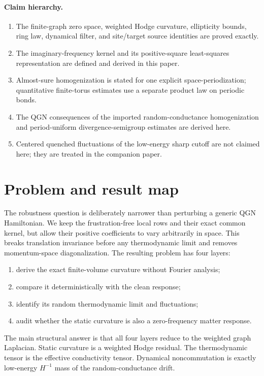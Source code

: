 \documentclass[11pt]{article}
\theoremstyle{definition}
\theoremstyle{remark}
\begin{document}
\paragraph{Claim hierarchy.}
\begin{enumerate}[leftmargin=2.2em,itemsep=0.2em]
 \item The finite-graph zero space, weighted Hodge curvature, ellipticity bounds, ring law, dynamical filter, and site/target source identities are proved exactly.
 \item The imaginary-frequency kernel and its positive-square least-squares representation are defined and derived in this paper.
 \item Almost-sure homogenization is stated for one explicit space-periodization; quantitative finite-torus estimates use a separate product law on periodic bonds.
 \item The QGN consequences of the imported random-conductance homogenization and period-uniform divergence-semigroup estimates are derived here.
 \item Centered quenched fluctuations of the low-energy sharp cutoff are not claimed here; they are treated in the companion paper.
\end{enumerate}
\section{Problem and result map}

The robustness question is deliberately narrower than perturbing a generic QGN Hamiltonian.  We keep the frustration-free local rows and their exact common kernel, but allow their positive coefficients to vary arbitrarily in space.  This breaks translation invariance before any thermodynamic limit and removes momentum-space diagonalization.  The resulting problem has four layers:
\begin{enumerate}[label=\textup{(\roman*)},leftmargin=2.5em]
 \item derive the exact finite-volume curvature without Fourier analysis;
 \item compare it deterministically with the clean response;
 \item identify its random thermodynamic limit and fluctuations;
 \item audit whether the static curvature is also a zero-frequency matter response.
\end{enumerate}

The main structural answer is that all four layers reduce to the weighted graph Laplacian.  Static curvature is a weighted Hodge residual.  The thermodynamic tensor is the effective conductivity tensor.  Dynamical noncommutation is exactly low-energy $H^{-1}$ mass of the random-conductance drift.
\end{document}
